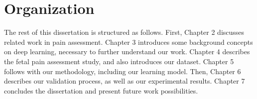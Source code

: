 \section{Organization}

The rest of this dissertation is structured as follows. First, Chapter 2 discusses related work in pain assessment. Chapter 3 introduces some background concepts on deep learning, necessary to further understand our work. Chapter 4 describes the fetal pain assessment study, and also introduces our dataset. Chapter 5 follows with our methodology, including our learning model. Then, Chapter 6 describes our validation process, as well as our experimental results. Chapter 7 concludes the dissertation and present future work possibilities.